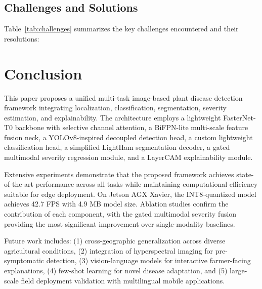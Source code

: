 \documentclass[10pt,a4paper,twocolumn]{article}
\begin{document}
\subsection{Challenges and Solutions}

Table~\ref{tab:challenges} summarizes the key challenges encountered and their resolutions:

\begin{table}[htbp]
\centering
\caption{Implementation challenges and solutions}
\label{tab:challenges}
\end{table}

\section{Conclusion}
\label{sec:conclusion}

This paper proposes a unified multi-task image-based plant disease detection framework integrating localization, classification, segmentation, severity estimation, and explainability. The architecture employs a lightweight FasterNet-T0 backbone with selective channel attention, a BiFPN-lite multi-scale feature fusion neck, a YOLOv8-inspired decoupled detection head, a custom lightweight classification head, a simplified LightHam segmentation decoder, a gated multimodal severity regression module, and a LayerCAM explainability module.

Extensive experiments demonstrate that the proposed framework achieves state-of-the-art performance across all tasks while maintaining computational efficiency suitable for edge deployment. On Jetson AGX Xavier, the INT8-quantized model achieves 42.7 FPS with 4.9 MB model size. Ablation studies confirm the contribution of each component, with the gated multimodal severity fusion providing the most significant improvement over single-modality baselines.

Future work includes: (1) cross-geographic generalization across diverse agricultural conditions, (2) integration of hyperspectral imaging for pre-symptomatic detection, (3) vision-language models for interactive farmer-facing explanations, (4) few-shot learning for novel disease adaptation, and (5) large-scale field deployment validation with multilingual mobile applications.



\end{document}
